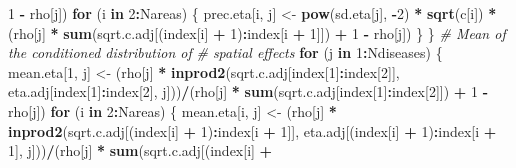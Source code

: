 \documentclass[]{article}
\newenvironment{Shaded}{\begin{snugshade}}{\end{snugshade}}
\newcommand{\KeywordTok}[1]{\textcolor[rgb]{0.13,0.29,0.53}{\textbf{#1}}}
\newcommand{\DecValTok}[1]{\textcolor[rgb]{0.00,0.00,0.81}{#1}}
\newcommand{\StringTok}[1]{\textcolor[rgb]{0.31,0.60,0.02}{#1}}
\newcommand{\CommentTok}[1]{\textcolor[rgb]{0.56,0.35,0.01}{\textit{#1}}}
\newcommand{\ControlFlowTok}[1]{\textcolor[rgb]{0.13,0.29,0.53}{\textbf{#1}}}
\newcommand{\OperatorTok}[1]{\textcolor[rgb]{0.81,0.36,0.00}{\textbf{#1}}}
\newcommand{\NormalTok}[1]{#1}
\begin{document}
\begin{Shaded}
\begin{Highlighting}[]
\StringTok{            }\DecValTok{1} \OperatorTok{-}\StringTok{ }\NormalTok{rho[j])}
        \ControlFlowTok{for}\NormalTok{ (i }\ControlFlowTok{in} \DecValTok{2}\OperatorTok{:}\NormalTok{Nareas) \{}
\NormalTok{            prec.eta[i, j] <-}\StringTok{ }\KeywordTok{pow}\NormalTok{(sd.eta[j], }
                \OperatorTok{-}\DecValTok{2}\NormalTok{) }\OperatorTok{*}\StringTok{ }\KeywordTok{sqrt}\NormalTok{(c[i]) }\OperatorTok{*}\StringTok{ }\NormalTok{(rho[j] }\OperatorTok{*}\StringTok{ }
\StringTok{                }\KeywordTok{sum}\NormalTok{(sqrt.c.adj[(index[i] }\OperatorTok{+}\StringTok{ }
\StringTok{                  }\DecValTok{1}\NormalTok{)}\OperatorTok{:}\NormalTok{index[i }\OperatorTok{+}\StringTok{ }\DecValTok{1}\NormalTok{]]) }\OperatorTok{+}\StringTok{ }\DecValTok{1} \OperatorTok{-}\StringTok{ }
\StringTok{                }\NormalTok{rho[j])}
\NormalTok{        \}}
\NormalTok{    \}}
    \CommentTok{# Mean of the conditioned distribution of}
    \CommentTok{# spatial effects}
    \ControlFlowTok{for}\NormalTok{ (j }\ControlFlowTok{in} \DecValTok{1}\OperatorTok{:}\NormalTok{Ndiseases) \{}
\NormalTok{        mean.eta[}\DecValTok{1}\NormalTok{, j] <-}\StringTok{ }\NormalTok{(rho[j] }\OperatorTok{*}\StringTok{ }\KeywordTok{inprod2}\NormalTok{(sqrt.c.adj[index[}\DecValTok{1}\NormalTok{]}\OperatorTok{:}\NormalTok{index[}\DecValTok{2}\NormalTok{]], }
\NormalTok{            eta.adj[index[}\DecValTok{1}\NormalTok{]}\OperatorTok{:}\NormalTok{index[}\DecValTok{2}\NormalTok{], j]))}\OperatorTok{/}\NormalTok{(rho[j] }\OperatorTok{*}\StringTok{ }
\StringTok{            }\KeywordTok{sum}\NormalTok{(sqrt.c.adj[index[}\DecValTok{1}\NormalTok{]}\OperatorTok{:}\NormalTok{index[}\DecValTok{2}\NormalTok{]]) }\OperatorTok{+}\StringTok{ }
\StringTok{            }\DecValTok{1} \OperatorTok{-}\StringTok{ }\NormalTok{rho[j])}
        \ControlFlowTok{for}\NormalTok{ (i }\ControlFlowTok{in} \DecValTok{2}\OperatorTok{:}\NormalTok{Nareas) \{}
\NormalTok{            mean.eta[i, j] <-}\StringTok{ }\NormalTok{(rho[j] }\OperatorTok{*}\StringTok{ }\KeywordTok{inprod2}\NormalTok{(sqrt.c.adj[(index[i] }\OperatorTok{+}\StringTok{ }
\StringTok{                }\DecValTok{1}\NormalTok{)}\OperatorTok{:}\NormalTok{index[i }\OperatorTok{+}\StringTok{ }\DecValTok{1}\NormalTok{]], eta.adj[(index[i] }\OperatorTok{+}\StringTok{ }
\StringTok{                }\DecValTok{1}\NormalTok{)}\OperatorTok{:}\NormalTok{index[i }\OperatorTok{+}\StringTok{ }\DecValTok{1}\NormalTok{], j]))}\OperatorTok{/}\NormalTok{(rho[j] }\OperatorTok{*}\StringTok{ }
\StringTok{                }\KeywordTok{sum}\NormalTok{(sqrt.c.adj[(index[i] }\OperatorTok{+}\StringTok{ }

\end{Highlighting}
\end{Shaded}
\end{document}
